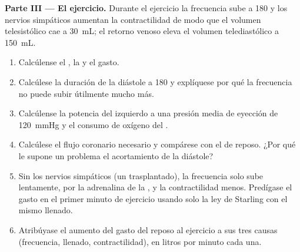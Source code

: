 \begin{problem}
\medskip
\noindent\textbf{Parte III --- El ejercicio.}
Durante el ejercicio la frecuencia sube a 180 y los nervios simpáticos
aumentan la contractilidad de modo que el volumen telesistólico cae a
\qty{30}{mL}; el retorno venoso eleva el volumen telediastólico a
\qty{150}{mL}.
\begin{enumerate}[resume]
  \item Calcúlense el , la  y el
        gasto.
  \item Calcúlese la duración de la diástole a 180 y explíquese por qué la
        frecuencia no puede subir útilmente mucho más.
  \item Calcúlense la potencia del  izquierdo a una presión media
        de eyección de \qty{120}{mmHg} y el consumo de oxígeno del .
  \item Calcúlese el flujo coronario necesario y compárese con el de
        reposo. ¿Por qué le supone un problema el acortamiento de la
        diástole?
  \item Sin los nervios simpáticos (un  trasplantado), la frecuencia
        solo sube lentamente, por la adrenalina de la , y la
        contractilidad menos. Predígase el gasto en el primer minuto de
        ejercicio usando solo la ley de Starling con el mismo llenado.
  \item Atribúyase el aumento del gasto del reposo al ejercicio a sus tres
        causas (frecuencia, llenado, contractilidad), en litros por minuto
        cada una.
\end{enumerate}


\end{problem}
